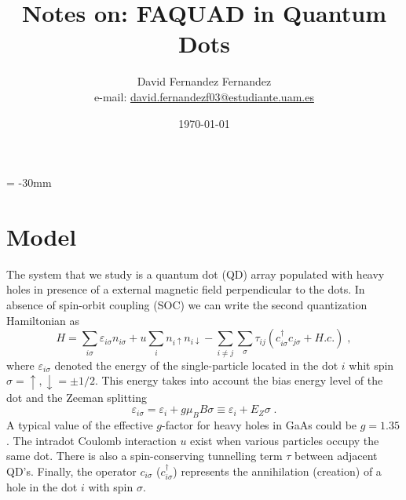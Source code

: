 \documentclass[a4paper,11pt]{article}
\begin{document}
   \droptitle = -30mm
   \title{Notes on: FAQUAD in Quantum Dots}

   \author{David Fernandez Fernandez \\ e-mail: \href{mailto:david.fernandezf03@estudiante.uam.es}{david.fernandezf03@estudiante.uam.es}}
   
   \date{\today}

   \maketitle
   
   \tableofcontents
    

\section{Model}

The system that we study is a quantum dot (QD) array populated with heavy holes in presence of a external magnetic field perpendicular to the dots. In absence of spin-orbit coupling (SOC) we can write the second quantization Hamiltonian as
\begin{equation}
	H=\sum_{i\sigma}\varepsilon_{i\sigma}n_{i\sigma}+u\sum_in_{i\uparrow}n_{i\downarrow}-\sum_{i\neq j}\sum_\sigma\tau_{ij}\left(c_{i\sigma}^\dagger c_{j\sigma}+H.c.\right)\; ,
	\label{eq:Hubbard_model}
\end{equation}
where $\varepsilon_{i\sigma}$ denoted the energy of the single-particle located in the dot $i$ whit spin $\sigma=\uparrow,\downarrow=\pm1/2$. This energy takes into account the bias energy level of the dot and the Zeeman splitting
\begin{equation}
	\varepsilon_{i\sigma}=\varepsilon_i+g\mu_B B\sigma\equiv \varepsilon_i+E_Z\sigma\; .
\end{equation}
A typical value of the effective $g$-factor for heavy holes in GaAs could be $g=1.35$. The intradot Coulomb interaction $u$ exist when various particles occupy the same dot. There is also a spin-conserving tunnelling term $\tau$ between adjacent QD's. Finally, the operator $c_{i\sigma}$ ($c_{i\sigma}^{\dagger}$) represents the annihilation (creation) of a hole in the dot $i$ with spin $\sigma$.
\end{document}

